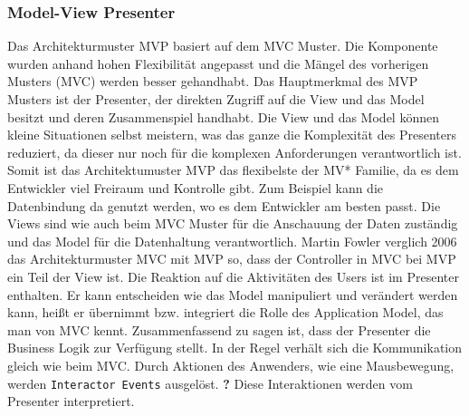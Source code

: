 \setcounter{secnumdepth}{3}
\subsubsection{Model-View Presenter}
Das Architekturmuster \ac{MVP} basiert auf dem \ac{MVC} Muster. Die Komponente wurden anhand hohen Flexibilit\"at angepasst und die M\"angel des vorherigen Musters (\ac{MVC}) werden besser gehandhabt.  Das Hauptmerkmal des \ac{MVP} Musters ist der Presenter, der direkten Zugriff auf die View und das Model besitzt und deren Zusammenspiel handhabt. Die View und das Model k\"onnen kleine Situationen selbst meistern, was das ganze die Komplexit\"at des Presenters reduziert, da dieser nur noch f\"ur die komplexen Anforderungen verantwortlich ist. Somit ist das Architektumuster \ac{MVP} das flexibelste der MV* Familie, da es dem Entwickler viel Freiraum und Kontrolle gibt. Zum Beispiel kann die Datenbindung da genutzt werden, wo es dem Entwickler am besten passt\cite{Syromiatnikov2014}.
Die Views sind wie auch beim \ac{MVC} Muster f\"ur die Anschauung der Daten zust\"andig und das Model f\"ur die Datenhaltung verantwortlich. Martin Fowler verglich 2006 das Architekturmuster \ac{MVC} mit \ac{MVP} so, dass der Controller in \ac{MVC} bei  \ac{MVP} ein Teil der View ist\cite{Bragge2013}. Die Reaktion auf die Aktivit\"aten des Users ist im Presenter enthalten. Er kann entscheiden wie das Model manipuliert und ver\"andert werden kann, hei\ss{}t er \"ubernimmt bzw. integriert die Rolle des Application Model, das man von \ac{MVC} kennt. Zusammenfassend zu sagen ist, dass der Presenter die Business Logik zur Verf\"ugung stellt.
In der Regel verh\"alt sich die Kommunikation gleich wie beim \ac{MVC}. Durch Aktionen des Anwenders, wie eine Mausbewegung, werden \texttt{Interactor Events} ausgel\"ost. \textbf{?} Diese Interaktionen werden vom Presenter interpretiert\cite{Potel1996}.




